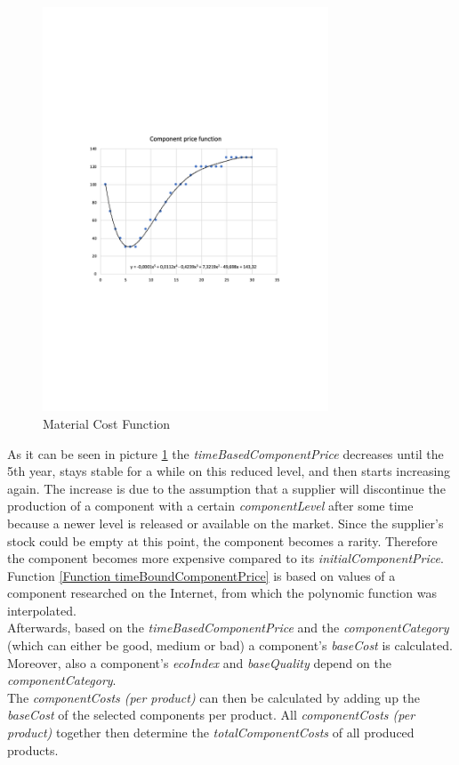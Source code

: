 \begin{figure}
	\centering
	\includegraphics[width=8.5cm]{images/materialCostFunction.pdf}
	\caption{Material Cost Function}
	\label{img:materialCostFunction}
\end{figure}

As it can be seen in picture \ref{img:materialCostFunction} the \textit{timeBasedComponentPrice} decreases until the 5th year, stays stable for a while on this reduced level, and then starts increasing again. The increase is due to the assumption that a supplier will discontinue the production of a component with a certain \textit{componentLevel} after some time because a newer level is released or available on the market. Since the supplier’s stock could be empty at this point, the component becomes a rarity. Therefore the component becomes more expensive compared to its \textit{initialComponentPrice}. Function \ref{Function timeBoundComponentPrice} is based on values of a component researched on the Internet, from which the polynomic function was interpolated.\\
Afterwards, based on the \textit{timeBasedComponentPrice} and the \textit{componentCategory} (which can either be good, medium or bad) a component's \textit{baseCost} is calculated. Moreover, also a component's \textit{ecoIndex} and \textit{baseQuality} depend on the \textit{componentCategory}.\\
The \textit{componentCosts (per product)} can then be calculated by adding up the \textit{baseCost} of the selected components per product. All \textit{componentCosts (per product)} together then determine the \textit{totalComponentCosts} of all produced products.\\

